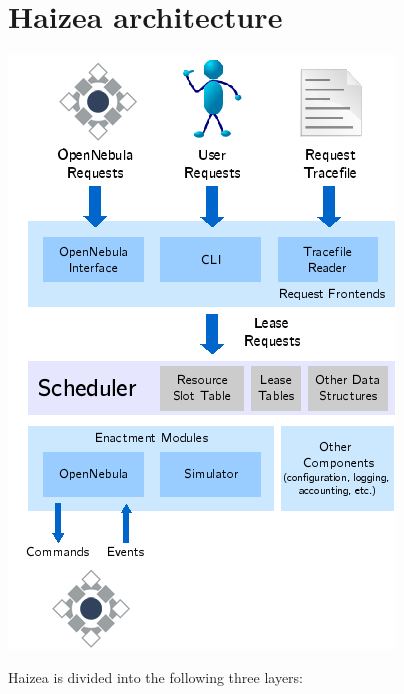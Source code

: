 \section{Haizea architecture}

\begin{center}
\includegraphics{images/architecture.png}
\end{center}

Haizea is divided into the following three layers:

